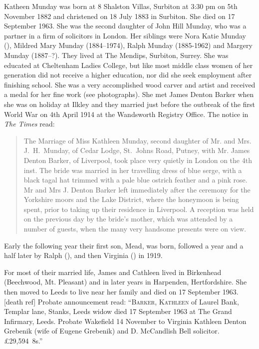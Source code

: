 
Katheen Munday was born at 8 Shalston Villas, Surbiton at 3:30 pm on 5th November 1882\cite{JHMtree, KMbirthCert, JHMbible} and christened on 18 July 1883 in Surbiton. She died on 17 September 1963. She was the second daughter of John Hill Munday, who was a partner in a firm of solicitors in London. Her siblings were Nora Katie Munday (), Mildred Mary Munday (1884--1974), Ralph Munday (1885-1962) and Margery Munday (1887--?). They lived at The Mendips, Surbiton, Surrey.  She was educated at Cheltenham Ladies College, but like most middle class women of her generation did not receive a higher education, nor did she seek employment after finishing school. She was a very accomplished wood carver and artist and received a medal for her fine work (see photographs). She met James Denton Barker when she was on holiday at Ilkley and they married just before the outbreak of the first World War on 4th April 1914 at the Wandsworth Registry Office.\cite{KathleenJamesWeddingIndex} The notice in \emph{The Times} read:

\begin{quotation}
The Marriage of Miss Kathleen Munday, second daughter of Mr. and Mrs. J.\ H.\ Munday, of Cedar Lodge, St.\ Johns Road, Putney, with Mr. James Denton Barker, of Liverpool, took place very quietly in London on the 4th inst. The bride was married in her travelling dress of blue serge, with a black tagal hat trimmed with a pale blue ostrich feather and a pink rose. Mr and Mrs J. Denton Barker left immediately after the ceremony for the Yorkshire moors and the Lake District, where the honeymoon is being spent, prior to taking up their residence in Liverpool. A reception was held on the previous day by the bride's mother, which was attended by a number of guests, when the many very handsome presents were on view.
\end{quotation}

Early the following year their first son, Mead, was born, followed a year and a half later by Ralph (), and then Virginia () in 1919.

For most of their married life, James and Cathleen lived in Birkenhead (Beechwood, Mt. Pleasant) and in later years in Harpenden, Hertfordshire. She then moved to Leeds to live near her family and died on 17 September 1963.[death ref] Probate announcement read: ``\textsc{Barker, Kathleen} of Laurel Bank, Templar lane, Stanks, Leeds widow died 17 September 1963 at The Grand Infirmary, Leeds. Probate Wakefield 14 November to Virginia Kathleen Denton Grebenik (wife of Eugene Grebenik) and D. McCandlish Bell solicitor. \pounds29,594~8s.''
